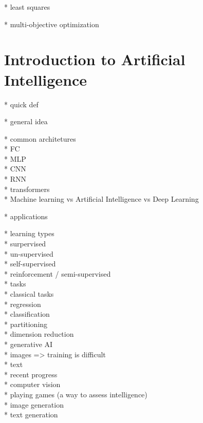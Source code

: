 * least squares

* multi-objective optimization

\section{Introduction to Artificial Intelligence}

* quick def

* general idea

* common architetures\\
  * FC\\
  * MLP\\
  * CNN\\
  * RNN\\
  * transformers\\

* Machine learning vs Artificial Intelligence vs Deep Learning

* applications

* learning types\\
  * surpervised\\
  * un-supervised\\
  * self-supervised\\
  * reinforcement / semi-supervised\\

* tasks\\
  * classical tasks\\
    * regression\\
    * classification\\
    * partitioning\\
    * dimension reduction\\
  * generative AI\\
    * images => training is difficult\\
    * text\\

* recent progress\\
  * computer vision\\
  * playing games (a way to assess intelligence)\\
  * image generation\\
  * text generation\\





